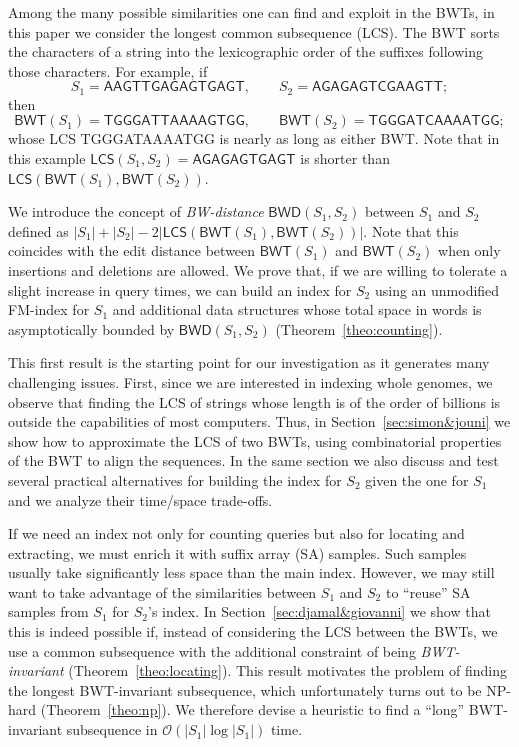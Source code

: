 \documentclass{llncs}
\newcommand{\Oh}[1]
  {\ensuremath{\mathcal{O}\!\left( {#1} \right)}}
\newcommand{\LCS}
  {\ensuremath{\mathsf{LCS}}}
\newcommand{\BWD}
  {\ensuremath{\mathsf{BWD}}}
\newcommand{\BWT}
  {\ensuremath{\mathsf{BWT}}}
\begin{document}
Among the many possible similarities one can find and exploit in the BWTs, in
this paper we consider the longest common subsequence (LCS). The BWT sorts
the characters of a string into the lexicographic order of the suffixes
following those characters.  For example, if
$$
S_1 = \mathsf{AAGTTGAGAGTGAGT},\qquad
S_2 = \mathsf{AGAGAGTCGAAGTT};
$$
then
$$
\BWT (S_1) = \mathsf{TGGGATTAAAAGTGG},\qquad
\BWT (S_2) = \mathsf{TGGGATCAAAATGG};
$$
whose LCS {\sf TGGGATAAAATGG} is nearly as long as either BWT. Note that in
this example $\LCS(S_1,S_2)=\mathsf{AGAGAGTGAGT}$ is shorter than $\LCS(\BWT
(S_1),\BWT (S_2))$.

We introduce the concept of {\em BW-distance} \(\BWD (S_1, S_2)\) between
$S_1$ and $S_2$ defined as $|S_1| + |S_2| - 2 |\LCS(\BWT (S_1),\BWT (S_2))|$.
Note that this coincides with the edit distance between $\BWT (S_1)$ and
$\BWT (S_2)$ when only insertions and deletions are allowed. We prove that,
if we are willing to tolerate a slight increase in query times, we can build
an index for $S_2$ using an unmodified FM-index for $S_1$ and additional data
structures whose total space in words is asymptotically bounded by $\BWD
(S_1, S_2)$ (Theorem~\ref{theo:counting}).

This first result is the starting point for our investigation as it generates
many challenging issues. First, since we are interested in indexing whole
genomes, we observe that finding the LCS of strings
whose length is of the order of billions is outside the capabilities of most
computers. Thus, in Section~\ref{sec:simon&jouni} we show how to approximate
the LCS of two BWTs, using combinatorial properties of
the BWT to align the sequences. In the same section we also discuss and test
several practical alternatives for building the index for $S_2$ given the one
for $S_1$ and we analyze their time/space trade-offs.

If we need an index not only for counting queries but also for locating and
extracting, we must enrich it with suffix array (SA) samples. Such samples
usually take significantly less space than the main index. However, we may
still want to take advantage of the similarities between $S_1$ and $S_2$ to
``reuse'' SA samples from $S_1$ for $S_2$'s index. In
Section~\ref{sec:djamal&giovanni} we show that this is indeed possible if,
instead of considering the LCS between the BWTs, we use a common subsequence
with the additional constraint of being {\em BWT-invariant}
(Theorem~\ref{theo:locating}). This result motivates the problem of finding
the longest BWT-invariant subsequence, which unfortunately turns out to be
NP-hard (Theorem~\ref{theo:np}). We therefore devise a heuristic to find a
``long'' BWT-invariant subsequence in $\Oh{|S_1|\log|S_1|}$ time.
\end{document}

